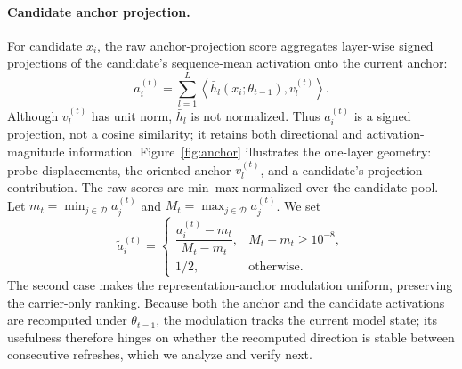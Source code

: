 \paragraph{Candidate anchor projection.}
For candidate \(x_i\), the raw anchor-projection score aggregates
layer-wise signed projections of the candidate's sequence-mean
activation onto the current anchor:
\begin{equation}
  a_i^{(t)}
  =
  \sum_{l=1}^{L}
  \left\langle
  \bar h_l(x_i;\theta_{t-1}),
  v_l^{(t)}
  \right\rangle .
  \label{eq:raw-anchor-projection}
\end{equation}
Although \(v_l^{(t)}\) has unit norm, \(\bar h_l\) is not
normalized. Thus \(a_i^{(t)}\) is a signed projection, not a cosine
similarity; it retains both directional and activation-magnitude
information. Figure~\ref{fig:anchor} illustrates the one-layer
geometry: probe displacements, the oriented anchor \(v_l^{(t)}\),
and a candidate's projection contribution. The raw scores are
min--max normalized over the candidate pool. Let
\(m_t=\min_{j\in\mathcal D}a_j^{(t)}\) and
\(M_t=\max_{j\in\mathcal D}a_j^{(t)}\). We set
\begin{equation}
  \widetilde a_i^{(t)}
  =
  \begin{cases}
  \dfrac{a_i^{(t)}-m_t}{M_t-m_t},
  & M_t-m_t\ge 10^{-8},\\[4pt]
  1/2, & \text{otherwise}.
  \end{cases}
  \label{eq:anchor-projection-norm}
\end{equation}
The second case makes the representation-anchor modulation uniform,
preserving the carrier-only ranking. Because both the anchor and the
candidate activations are recomputed under \(\theta_{t-1}\), the
modulation tracks the current model state; its usefulness therefore
hinges on whether the recomputed direction is stable between
consecutive refreshes, which we analyze and verify next.


